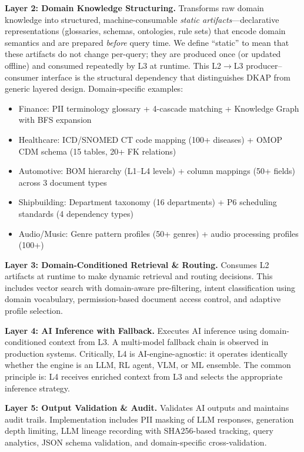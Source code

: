 \documentclass[fleqn,10pt,lineno]{wlpeerj}
\begin{document}
\textbf{Layer 2: Domain Knowledge Structuring.} Transforms raw domain knowledge into structured, machine-consumable \textit{static artifacts}---declarative representations (glossaries, schemas, ontologies, rule sets) that encode domain semantics and are prepared \textit{before} query time. We define ``static'' to mean that these artifacts do not change per-query; they are produced once (or updated offline) and consumed repeatedly by L3 at runtime. This L2$\rightarrow$L3 producer--consumer interface is the structural dependency that distinguishes DKAP from generic layered design. Domain-specific examples:
\begin{itemize}[nosep]
\item Finance: PII terminology glossary + 4-cascade matching + Knowledge Graph with BFS expansion
\item Healthcare: ICD/SNOMED CT code mapping (100+ diseases) + OMOP CDM schema (15 tables, 20+ FK relations)
\item Automotive: BOM hierarchy (L1--L4 levels) + column mappings (50+ fields) across 3 document types
\item Shipbuilding: Department taxonomy (16 departments) + P6 scheduling standards (4 dependency types)
\item Audio/Music: Genre pattern profiles (50+ genres) + audio processing profiles (100+)
\end{itemize}

\textbf{Layer 3: Domain-Conditioned Retrieval \& Routing.} Consumes L2 artifacts at runtime to make dynamic retrieval and routing decisions. This includes vector search with domain-aware pre-filtering, intent classification using domain vocabulary, permission-based document access control, and adaptive profile selection.

\textbf{Layer 4: AI Inference with Fallback.} Executes AI inference using domain-conditioned context from L3. A multi-model fallback chain is observed in production systems. Critically, L4 is AI-engine-agnostic: it operates identically whether the engine is an LLM, RL agent, VLM, or ML ensemble. The common principle is: L4 receives enriched context from L3 and selects the appropriate inference strategy.

\textbf{Layer 5: Output Validation \& Audit.} Validates AI outputs and maintains audit trails. Implementation includes PII masking of LLM responses, generation depth limiting, LLM lineage recording with SHA256-based tracking, query analytics, JSON schema validation, and domain-specific cross-validation.
\end{document}

